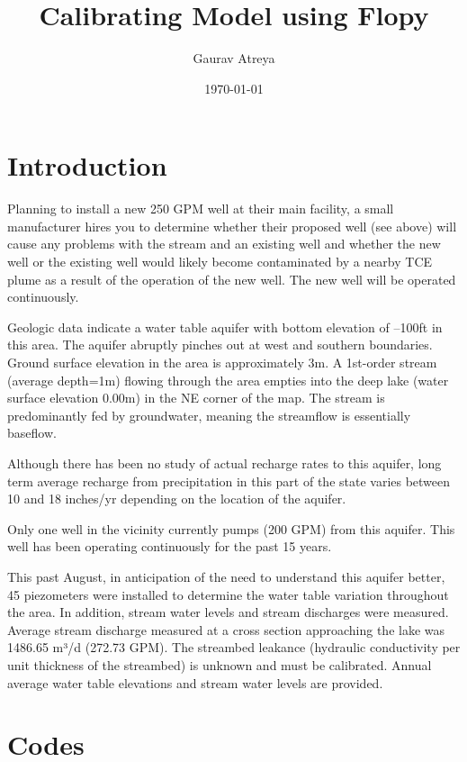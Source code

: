 \documentclass[titlepage,12pt]{unisubmission}
\author{Gaurav Atreya}
\date{\today}
\title{Calibrating Model using Flopy}
\begin{document}
\maketitle
\setcounter{tocdepth}{2}
\tableofcontents
\section{Introduction}
\label{sec:orgf52c576}

Planning to install a new 250 GPM well at their main facility, a small manufacturer hires you to determine whether their proposed well (see above) will cause any problems with the stream and an existing well and whether the new well or the existing well would likely become contaminated by a nearby TCE plume as a result of the operation of the new well. The new well will be operated continuously.

Geologic data indicate a water table aquifer with bottom elevation of –100ft in this area. The aquifer abruptly pinches out at west and southern boundaries. Ground surface elevation in the area is approximately 3m. A 1st-order stream (average depth=1m) flowing through the area empties into the deep lake (water surface elevation 0.00m) in the NE corner of the map. The stream is predominantly fed by groundwater, meaning the streamflow is essentially baseflow.

Although there has been no study of actual recharge rates to this aquifer, long term average recharge from precipitation in this part of the state varies between 10 and 18 inches/yr depending on the location of the aquifer.

Only one well in the vicinity currently pumps (200 GPM) from this aquifer. This well has been operating continuously for the past 15 years.

This past August, in anticipation of the need to understand this aquifer better, 45 piezometers were installed to determine the water table variation throughout the area. In addition, stream water levels and stream discharges were measured. Average stream discharge measured at a cross section approaching the lake was 1486.65 m³/d (272.73 GPM). The streambed leakance (hydraulic conductivity per unit thickness of the streambed) is unknown and must be calibrated. Annual average water table elevations and stream water levels are provided.

\section{Codes}
\label{sec:org5a0e5f4}
\end{document}
